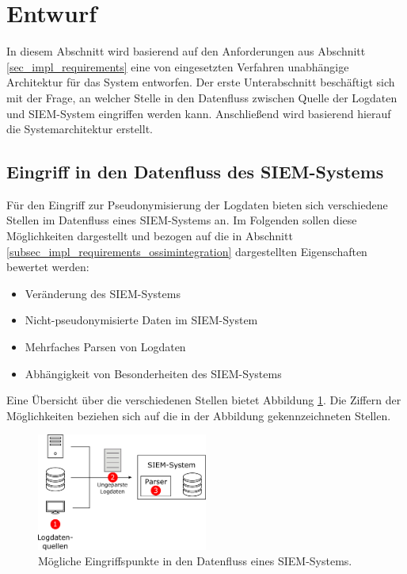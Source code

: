 \section{Entwurf}

\label{sec_impl_architecture}

In diesem Abschnitt wird basierend auf den Anforderungen aus Abschnitt \ref{sec_impl_requirements} eine von eingesetzten Verfahren unabhängige Architektur für das System entworfen. Der erste Unterabschnitt beschäftigt sich mit der Frage, an welcher Stelle in den Datenfluss zwischen Quelle der Logdaten und SIEM-System eingriffen werden kann. Anschließend wird basierend hierauf die Systemarchitektur erstellt.

\subsection{Eingriff in den Datenfluss des SIEM-Systems}

\label{sec_over_dataflow_siem}


Für den Eingriff zur Pseudonymisierung der Logdaten bieten sich verschiedene Stellen im Datenfluss eines SIEM-Systems an. Im Folgenden sollen diese Möglichkeiten dargestellt und bezogen auf die in Abschnitt \ref{subsec_impl_requirements_ossimintegration} dargestellten Eigenschaften bewertet werden:
\begin{itemize}
  \item Veränderung des SIEM-Systems
  \item Nicht-pseudonymisierte Daten im SIEM-System
  \item Mehrfaches Parsen von Logdaten
  \item Abhängigkeit von Besonderheiten des SIEM-Systems
\end{itemize}
Eine Übersicht über die verschiedenen Stellen bietet Abbildung \ref{fig:siem_data_access_point}. Die Ziffern der Möglichkeiten beziehen sich auf die in der Abbildung gekennzeichneten Stellen.

\begin{figure}[]
    \centering
        \includegraphics[width=0.5\textwidth]{dia/siem_data_access_point.pdf}
    \caption{Mögliche Eingriffspunkte in den Datenfluss eines SIEM-Systems.}
    \label{fig:siem_data_access_point}
\end{figure}

